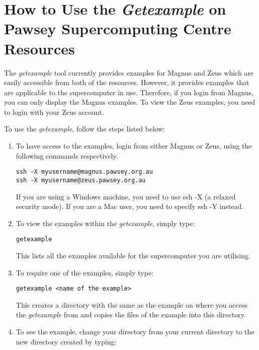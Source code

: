 \section{How to Use the \emph{Getexample} on Pawsey Supercomputing Centre Resources}

The \emph{getexample} tool currently provides examples for Magnus and Zeus which are easily accessible from both of the resources. However, it provides
examples that are applicable to the supercomputer in use. Therefore, if you login from Magnus, you can only display the Magnus examples. To view the
Zeus examples, you need to login with your Zeus account.

To use the \emph{getexample}, follow the steps listed below:

\begin{enumerate}
\item To have access to the examples, login from either Magnus or Zeus, using the following commands respectively.
\begin{tcolorbox}
\begin{Verbatim}[fontsize=\scriptsize]
ssh -X myusername@magnus.pawsey.org.au
ssh -X myusername@zeus.pawsey.org.au
\end{Verbatim}
\end{tcolorbox}
If you are using a Windows machine, you need to use ssh -X (a relaxed security mode). If you are a Mac user, you need to specify ssh -Y instead.
\item To view the examples within the \emph{getexample}, simply type:
\begin{tcolorbox}
\begin{Verbatim}[fontsize=\scriptsize]
getexample
\end{Verbatim}
\end{tcolorbox} 
This lists all the examples available for the supercomputer you are utilising.
\item To require one of the examples, simply type: 
\begin{tcolorbox}
\begin{Verbatim}[fontsize=\scriptsize]
getexample <name of the example>
\end{Verbatim}
\end{tcolorbox} 
This creates a directory with the same as the example on where you access the \emph{getexample} from and copies the files of the example into this 
directory.
\item To see the example, change your directory from your current directory to the new directory created by typing: 

\end{enumerate}
